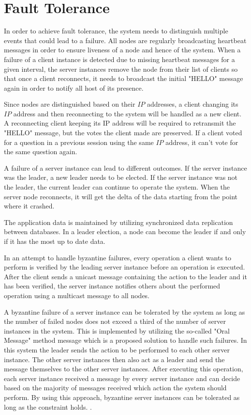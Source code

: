 \documentclass[runningheads]{llncs}
\begin{document}
\section{Fault Tolerance}

In order to achieve fault tolerance, the system needs to distinguish multiple events that could lead to a failure.
All nodes are regularly broadcasting heartbeat messages in order to ensure liveness of a node and hence of the system.
When a failure of a client instance is detected due to missing heartbeat messages for a given interval,
the server instances remove the node from their list of clients so that once a client reconnects,
it needs to broadcast the initial "HELLO" message again in order to notify all host of its presence. 

Since nodes are distinguished based on their $IP$ addresses, a client changing its $IP$ address and then reconnecting to the system will be handled as a new client.
A reconnecting client keeping its IP address will be required to retransmit the "HELLO" message, but the votes the client made are preserved.
If a client voted for a question in a previous session using the same $IP$ address, it can't vote for the same question again.

A failure of a server instance can lead to different outcomes.
If the server instance was the leader, a new leader needs to be elected.
If the server instance was not the leader, the current leader can continue to operate the system.
When the server node reconnects, it will get the delta of the data starting from the point where it crashed.

The application data is maintained by utilizing synchronized data replication between databases.
In a leader election, a node can become the leader if and only if it has the most up to date data.

In an attempt to handle byzantine failures, every operation a client wants to perform is verified by the leading server instance before an operation is executed.
After the client sends a unicast message containing the action to the leader and it has been verified,
the server instance notifies others about the performed operation using a multicast message to all nodes.

A byzantine failure of a server instance can be tolerated by the system as long as the number of failed nodes does not exceed a third of the number of server instances in the system.
This is implemented by utilizing the so-called "Oral Message" method message which is a proposed solution to handle such failures.
In this system the leader sends the action to be performed to each other server instance.
The other server instances then also act as a leader and send the message themselves to the other server instances.
After executing this operation, each server instance received a message by every server instance and can decide based on the majority of messages received which action the system should perform.
By using this approach, byzantine server instances can be tolerated as long as the constraint holds. \cite{lamport2019byzantine}.
\end{document}
